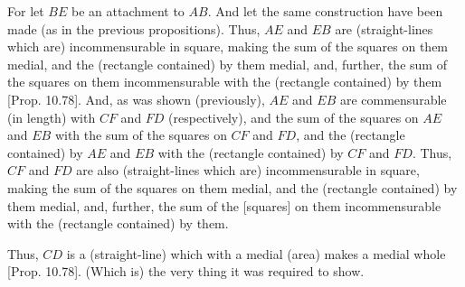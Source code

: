 \begin{Parallel}{}{}
{For let $BE$ be an attachment to $AB$. And let the same
construction have been made (as in the previous propositions). Thus,
$AE$ and $EB$ are (straight-lines which are) incommensurable in square, making
the sum of the squares on them medial, and the (rectangle contained)
by them medial, and, further, the sum of the squares on them incommensurable with the (rectangle contained) by them [Prop. 10.78].  And, as was shown (previously),
$AE$ and $EB$ are commensurable (in length) with $CF$ and $FD$ (respectively),
and the sum of the squares on $AE$ and $EB$ with the sum of the squares on
$CF$ and $FD$, and the (rectangle contained) by $AE$ and $EB$ with
the (rectangle contained) by $CF$ and $FD$. Thus, $CF$ and
$FD$ are also (straight-lines which are) incommensurable in square, making the sum of the squares on
them medial, and the (rectangle contained) by them medial, and, further,
the sum of the [squares] on them incommensurable with the (rectangle
contained) by them.

Thus, $CD$ is a (straight-line) which with a medial (area) makes a medial
whole [Prop. 10.78]. (Which is) the very thing
it was required to show.}
\end{Parallel}

